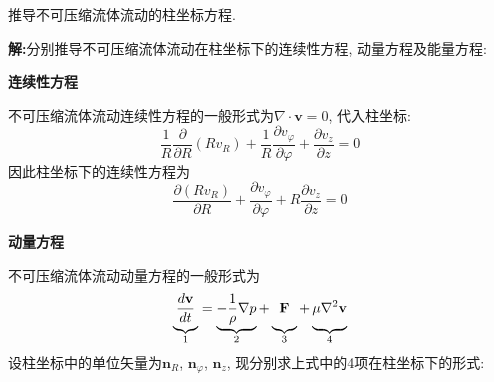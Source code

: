 \begin{problem}[问题3.2]
推导不可压缩流体流动的柱坐标方程.
\end{problem}
\begin{solution}
\textbf{解:}分别推导不可压缩流体流动在柱坐标下的连续性方程, 动量方程及能量方程:

\vspace{5pt}
\noindent\textbf{连续性方程}
\vspace{5pt}

\noindent 不可压缩流体流动连续性方程的一般形式为$\nabla\cdot\mathbf{v} = 0$, 代入柱坐标:
\[
\frac{1}{R}\frac{\partial }{\partial R}(Rv_R)
+ \frac{1}{R}\frac{\partial v_{\varphi}}{\partial \varphi} + \frac{\partial v_z}{\partial z} = 0
\]
因此柱坐标下的连续性方程为
\[
\frac{\partial (Rv_R)}{\partial R}+
\frac{\partial v_{\varphi}}{\partial \varphi} + R\frac{\partial v_z}{\partial z} = 0
\]

\vspace{5pt}
\noindent\textbf{动量方程}
\vspace{5pt}

\noindent 不可压缩流体流动动量方程的一般形式为
\[
\underbrace{\frac{d\mathbf{v}}{dt}\vphantom{\frac{1}{\rho}}}_{1} = \underbrace{- \frac{1}{\rho}\nabla p}_{2} + \underbrace{\mathbf{F}\vphantom{\frac{1}{\rho}}}_{3} +\underbrace{\mu\nabla^2\mathbf{v}\vphantom{\frac{1}{\rho}}}_{4}
\]
设柱坐标中的单位矢量为$\mathbf{n}_R$, $ \mathbf{n}_\varphi$, $\mathbf{n}_z$, 现分别求上式中的4项在柱坐标下的形式:


\end{solution}
